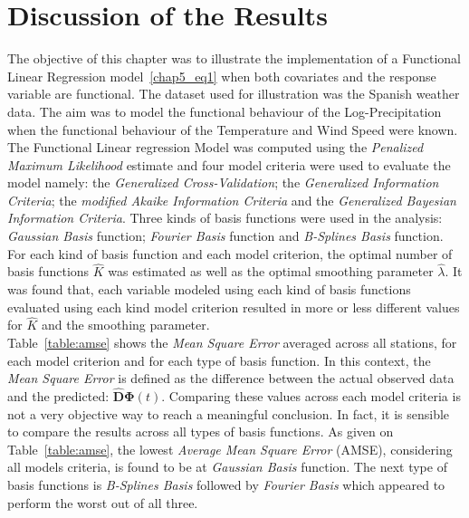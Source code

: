 \section{Discussion of the Results}
The objective of this chapter was to illustrate the implementation of a Functional Linear Regression model~\eqref{chap5_eq1} when both covariates and the response variable are functional. The dataset used for illustration was the Spanish weather data. The aim was to model the functional behaviour of the Log-Precipitation when the functional behaviour of the Temperature and Wind Speed were known. The Functional Linear regression Model was computed using the \textit{Penalized Maximum Likelihood} estimate and four model criteria were used to evaluate the model namely: the \textit{Generalized Cross-Validation}; the \textit{Generalized Information Criteria}; the \textit{modified Akaike Information Criteria} and the \textit{Generalized Bayesian Information Criteria}. Three kinds of basis functions were used in the analysis: \textit{Gaussian Basis} function; \textit{Fourier Basis} function and \textit{B-Splines Basis} function. For each kind of basis function and each model criterion, the optimal number of basis functions $\hat{K}$ was estimated as well as the optimal smoothing parameter $\hat{\lambda}$. It was found that, each variable modeled using each kind of basis functions evaluated using each kind model criterion resulted in more or less different values for $\hat{K}$ and the smoothing parameter.
\\
Table~\ref{table:amse} shows the \textit{Mean Square Error} averaged across all stations, for each model criterion and for each type of basis function. In this context, the \textit{Mean Square Error} is defined as the difference between the actual observed data and the predicted: $\bm{\hat{D}} \bm{\Phi}(t)$. Comparing these values across each model criteria is not a very objective way to reach a meaningful conclusion. In fact, it is sensible to compare the results across all types of basis functions.
As given on Table~\ref{table:amse}, the lowest \textit{Average Mean Square Error} (AMSE), considering all models criteria, is found to be at \textit{Gaussian Basis} function. The next type of basis functions is \textit{B-Splines Basis} followed by \textit{Fourier Basis} which appeared to perform the worst out of all three.


